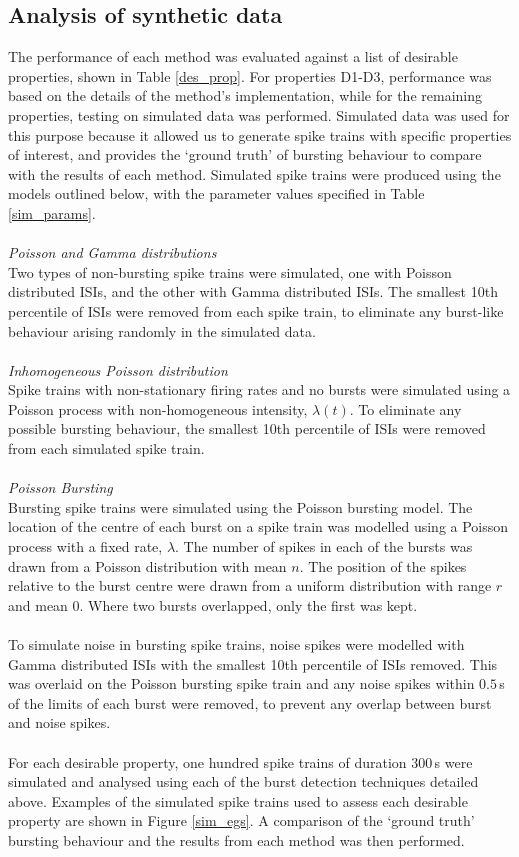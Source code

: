 \documentclass[12pt, titlepage]{article}
\begin{document}
\subsection*{Analysis of synthetic data}
The performance of each method was evaluated against a list of desirable properties, shown in Table \ref{des_prop}. For properties D1-D3, performance was based on the details of the method's implementation, while for the remaining properties, testing on simulated data was performed. Simulated data was used for this purpose because it allowed us to generate spike trains with specific properties of interest, and provides the `ground truth' of bursting behaviour to compare with the results of each method. Simulated spike trains were produced using the models outlined below, with the parameter values specified in Table \ref{sim_params}.
\\\\ 	\textit{Poisson and Gamma distributions}
\\Two types of non-bursting spike trains were simulated, one with Poisson distributed ISIs, and the other with Gamma distributed ISIs. The smallest 10th percentile of ISIs were removed from each spike train, to eliminate any burst-like behaviour arising randomly in the simulated data.
\\ \\  \textit{Inhomogeneous Poisson distribution}
\\ Spike trains with non-stationary firing rates and no bursts were simulated using a Poisson process with non-homogeneous intensity, $\lambda(t)$. To eliminate any possible bursting behaviour, the smallest 10th percentile of ISIs were removed from each simulated spike train.
\\ \\  \textit{Poisson Bursting}
\\ Bursting spike trains were simulated using the Poisson bursting model. The location of the centre of each burst on a spike train was modelled using a Poisson process with a fixed rate, $\lambda$. The number of spikes in each of the bursts was drawn from a Poisson distribution with mean $n$. The position of the spikes relative to the burst centre were drawn from a uniform distribution with range $r$ and mean 0. Where two bursts overlapped, only the first was kept. 
\\ \\ To simulate noise in bursting spike trains, noise spikes were modelled with Gamma distributed ISIs with the smallest 10th percentile of ISIs removed. This was overlaid on the Poisson bursting spike train and any noise spikes within $0.5 \,$s of the limits of each burst were removed, to prevent any overlap between burst and noise spikes.
\\ \\ For each desirable property, one hundred spike trains of duration 300$\,$s were simulated and analysed using each of the burst detection techniques detailed above. Examples of the simulated spike trains used to assess each desirable property are shown in Figure \ref{sim_egs}. A comparison of the `ground truth' bursting behaviour and the results from each method was then performed. 
\end{document}
